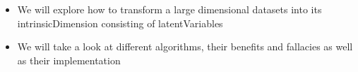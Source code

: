 \begin{itemize}
	\item We will explore how to transform a large dimensional datasets into its \gls{intrinsicDimension} consisting of \glspl{latentVariable}
	\item We will take a look at different algorithms, their benefits and fallacies as well as their implementation
\end{itemize}
